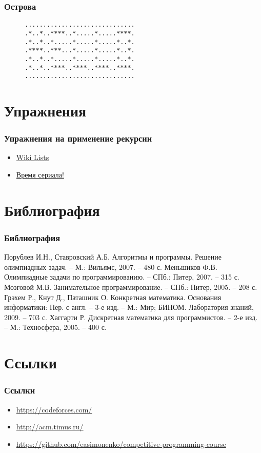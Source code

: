 \documentclass[11pt]{beamer}
\begin{document}
\begin{frame}
\frametitle{Острова}
\begin{figure}[h]
\center
\begin{alltt}
.............................. \\
.*..*..****..*.....*.....****. \\
.*..*..*.....*.....*.....*..*. \\
.****..***...*.....*.....*..*. \\
.*..*..*.....*.....*.....*..*. \\
.*..*..****..****..****..****. \\
..............................
\end{alltt}

\end{figure}
\end{frame}

\section{Упражнения}

\begin{frame}
\frametitle{Упражнения на применение рекурсии}
\begin{itemize}
	\item \href{https://codeforces.com/problemsets/acmsguru/problem/99999/461}{Wiki Lists}
	\item \href{https://codeforces.com/contest/60/problem/B}{Время сериала!}
\end{itemize}
\end{frame}

\section{Библиография}

\begin{frame}
\frametitle{Библиография}
\begin{thebibliography}{1}
   Порублев И.Н., Ставровский А.Б. Алгоритмы и программы.
  Решение олимпиадных задач. -- М.: Вильямс, 2007. -- 480 с.
   Меньшиков Ф.В. Олимпиадные задачи по программированию. -- СПб.: Питер,
  2007. -- 315 с.
   Мозговой М.В. Занимательное программирование. -- СПб.: Питер, 2005. -- 208 с.
   Грэхем Р., Кнут Д., Паташник О. Конкретная математика. Основания информатики: Пер. 
  с англ. -- 3-е изд. -- М.: Мир; БИНОМ. Лаборатория знаний, 2009. -- 703 с.
  \bibitem[Хаггарти]{} Хаггарти Р. Дискретная математика для программистов. – 2-е изд. – М.: Техносфера, 2005. – 400 с.
\end{thebibliography}
\end{frame}

\section{Ссылки}

\begin{frame}
\frametitle{Ссылки}
\begin{itemize}
	\item \url{https://codeforces.com/}
	\item \url{http://acm.timus.ru/}
	\item \url{https://github.com/easimonenko/competitive-programming-course}
\end{itemize}
\end{frame}
\end{document}
